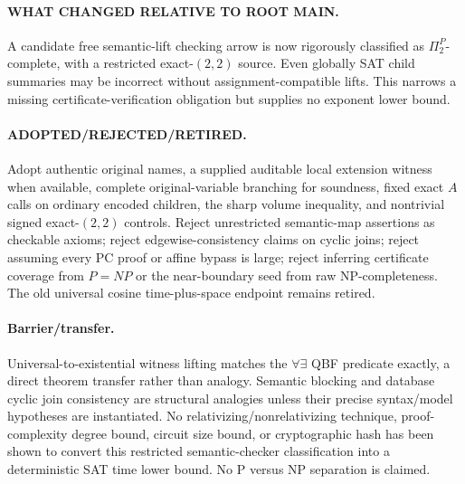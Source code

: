 \documentclass[11pt]{article}
\begin{document}
\paragraph{WHAT CHANGED RELATIVE TO ROOT MAIN.} A candidate free semantic-lift checking arrow is now rigorously classified as $\Pi_2^P$-complete, with a restricted exact-$(2,2)$ source. Even globally SAT child summaries may be incorrect without assignment-compatible lifts. This narrows a missing certificate-verification obligation but supplies no exponent lower bound.

\paragraph{ADOPTED/REJECTED/RETIRED.} Adopt authentic original names, a supplied auditable local extension witness when available, complete original-variable branching for soundness, fixed exact $A$ calls on ordinary encoded children, the sharp volume inequality, and nontrivial signed exact-$(2,2)$ controls. Reject unrestricted semantic-map assertions as checkable axioms; reject edgewise-consistency claims on cyclic joins; reject assuming every PC proof or affine bypass is large; reject inferring certificate coverage from $P=NP$ or the near-boundary seed from raw NP-completeness. The old universal cosine time-plus-space endpoint remains retired.

\paragraph{Barrier/transfer.} Universal-to-existential witness lifting matches the $\forall\exists$ QBF predicate exactly, a direct theorem transfer rather than analogy. Semantic blocking and database cyclic join consistency are structural analogies unless their precise syntax/model hypotheses are instantiated. No relativizing/nonrelativizing technique, proof-complexity degree bound, circuit size bound, or cryptographic hash has been shown to convert this restricted semantic-checker classification into a deterministic SAT time lower bound. No P versus NP separation is claimed.
\end{document}
